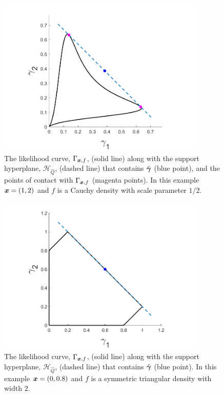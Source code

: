 	\begin{figure}
		\centering
		\includegraphics[width = 0.9\textwidth]{Figures/Mixtures/cauchy_support_hyperplane.png}
		\caption{The likelihood curve, $\Gamma_{{\bm{{x}}}, f}$, (solid line) along with the support hyperplane, $\mathcal{H}_{\hat{Q}}$, (dashed line) that contains $\hat{{\bm{{\gamma}}}}$ (blue point), and the points of contact with $\Gamma_{{\bm{{x}}}, f}$ (magenta points). In this example ${\bm{{x}}} = (1,2)$ and $f$ is a Cauchy density with scale parameter $1/2$.}
		\label{fig:cauchy support hyperplane}
	\end{figure}

	\begin{figure}
		\centering
		\includegraphics[width = 0.9\textwidth]{Figures/Mixtures/triangle_density_gamma.png}
		\caption{The likelihood curve, $\Gamma_{{\bm{{x}}}, f}$, (solid line) along with the support hyperplane, $\mathcal{H}_{\hat{Q}}$, (dashed line) that contains $\hat{{\bm{{\gamma}}}}$ (blue point). In this example ${\bm{{x}}} = (0,0.8)$ and $f$ is a symmetric triangular density with width $2$.}
		\label{fig:triangle support hyperplane}
	\end{figure}

